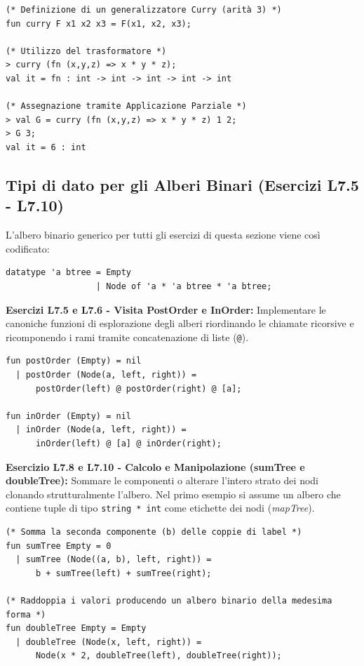 \documentclass[12pt, a4paper]{article}
\begin{document}
\begin{verbatim}
(* Definizione di un generalizzatore Curry (arità 3) *)
fun curry F x1 x2 x3 = F(x1, x2, x3);

(* Utilizzo del trasformatore *)
> curry (fn (x,y,z) => x * y * z);
val it = fn : int -> int -> int -> int -> int

(* Assegnazione tramite Applicazione Parziale *)
> val G = curry (fn (x,y,z) => x * y * z) 1 2;
> G 3;
val it = 6 : int
\end{verbatim}

\subsection{Tipi di dato per gli Alberi Binari (Esercizi L7.5 - L7.10)}
L'albero binario generico per tutti gli esercizi di questa sezione viene così codificato:
\begin{verbatim}
datatype 'a btree = Empty 
                  | Node of 'a * 'a btree * 'a btree;
\end{verbatim}

\textbf{Esercizi L7.5 e L7.6 - Visita PostOrder e InOrder:}
Implementare le canoniche funzioni di esplorazione degli alberi riordinando le chiamate ricorsive e ricomponendo i rami tramite concatenazione di liste (\texttt{@}).
\begin{verbatim}
fun postOrder (Empty) = nil
  | postOrder (Node(a, left, right)) = 
      postOrder(left) @ postOrder(right) @ [a];

fun inOrder (Empty) = nil
  | inOrder (Node(a, left, right)) = 
      inOrder(left) @ [a] @ inOrder(right);
\end{verbatim}

\newpage

\textbf{Esercizio L7.8 e L7.10 - Calcolo e Manipolazione (sumTree e doubleTree):}
Sommare le componenti o alterare l'intero strato dei nodi clonando strutturalmente l'albero. Nel primo esempio si assume un albero che contiene tuple di tipo \texttt{string * int} come etichette dei nodi (\textit{mapTree}).
\begin{verbatim}
(* Somma la seconda componente (b) delle coppie di label *)
fun sumTree Empty = 0
  | sumTree (Node((a, b), left, right)) = 
      b + sumTree(left) + sumTree(right);

(* Raddoppia i valori producendo un albero binario della medesima forma *)
fun doubleTree Empty = Empty
  | doubleTree (Node(x, left, right)) = 
      Node(x * 2, doubleTree(left), doubleTree(right));
\end{verbatim}
\end{document}
